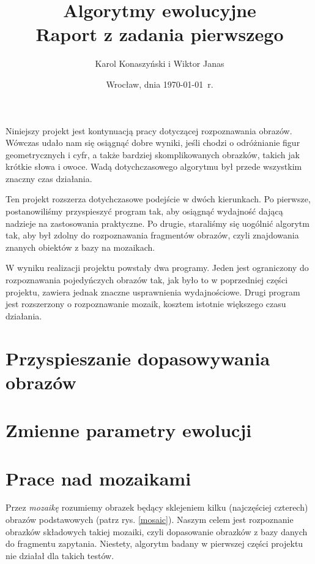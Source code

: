 \documentclass[a4paper,12pt,leqno]{article}
\title{\textbf{Algorytmy ewolucyjne}\\
       {\Large Raport z zadania pierwszego}\\[-1ex]}
\author{Karol Konaszyński i Wiktor Janas}
\date{Wrocław, dnia \today\ r.}
\begin{document}
\maketitle

Niniejszy projekt jest kontynuacją pracy dotyczącej rozpoznawania obrazów. Wówczas udało nam się osiągnąć dobre wyniki, jeśli chodzi o odróżnianie figur geometrycznych i cyfr, a także bardziej
skomplikowanych obrazków, takich jak krótkie słowa i owoce. Wadą dotychczasowego algorytmu był przede wszystkim znaczny czas działania.

Ten projekt rozszerza dotychczasowe podejście w dwóch kierunkach. Po pierwsze, postanowiliśmy przyspieszyć program tak, aby osiągnąć wydajność dającą nadzieje na zastosowania praktyczne.
Po drugie, staraliśmy się uogólnić algorytm tak, aby był zdolny do rozpoznawania fragmentów obrazów, czyli znajdowania znanych obiektów z bazy na mozaikach.

W wyniku realizacji projektu powstały dwa programy. Jeden jest ograniczony do rozpoznawania pojedyńczych obrazów tak, jak było to w poprzedniej części projektu, zawiera jednak znaczne
usprawnienia wydajnościowe. Drugi program jest rozszerzony o rozpoznawanie mozaik, kosztem istotnie większego czasu działania.

\section{Przyspieszanie dopasowywania obrazów}

\section{Zmienne parametry ewolucji}

\section{Prace nad mozaikami}

Przez \textit{mozaikę} rozumiemy obrazek będący sklejeniem kilku (najczęściej czterech) obrazów podstawowych (patrz rys. \ref{mosaic}).
Naszym celem jest rozpoznanie obrazków składowych takiej mozaiki, czyli dopasowanie obrazków z bazy danych do fragmentu zapytania.
Niestety, algorytm badany w pierwszej części projektu nie działał dla takich testów.
\end{document}
